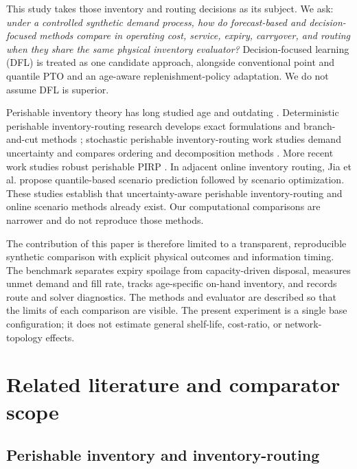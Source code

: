 \documentclass[11pt,a4paper]{article}
\begin{document}
This study takes those inventory and routing decisions as its subject. We ask: \emph{under a controlled synthetic demand process, how do forecast-based and decision-focused methods compare in operating cost, service, expiry, carryover, and routing when they share the same physical inventory evaluator?} Decision-focused learning (DFL) is treated as one candidate approach, alongside conventional point and quantile PTO and an age-aware replenishment-policy adaptation. We do not assume DFL is superior.

Perishable inventory theory has long studied age and outdating \citep{nahmias1982perishable,haijema2014new}. Deterministic perishable inventory-routing research develops exact formulations and branch-and-cut methods \citep{coelho2014optimal,alvarez2020formulations}; stochastic perishable inventory-routing work studies demand uncertainty and compares ordering and decomposition methods \citep{soysal2015modeling,crama2018stochastic}. More recent work studies robust perishable PIRP \citep{he2024robust}. In adjacent online inventory routing, Jia et al. \citep{jia2025scenario} propose quantile-based scenario prediction followed by scenario optimization. These studies establish that uncertainty-aware perishable inventory-routing and online scenario methods already exist. Our computational comparisons are narrower and do not reproduce those methods.

The contribution of this paper is therefore limited to a transparent, reproducible synthetic comparison with explicit physical outcomes and information timing. The benchmark separates expiry spoilage from capacity-driven disposal, measures unmet demand and fill rate, tracks age-specific on-hand inventory, and records route and solver diagnostics. The methods and evaluator are described so that the limits of each comparison are visible. The present experiment is a single base configuration; it does not estimate general shelf-life, cost-ratio, or network-topology effects.

\section{Related literature and comparator scope}

\subsection{Perishable inventory and inventory-routing}
\end{document}
